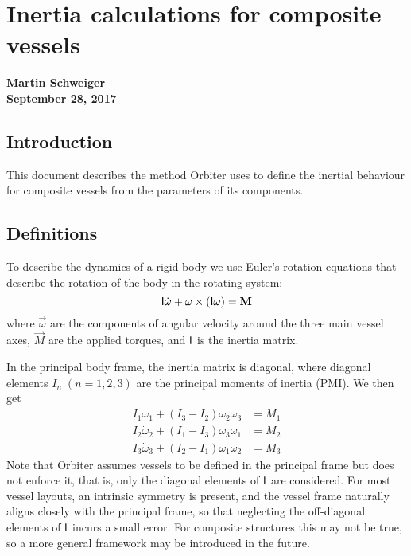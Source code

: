 \documentclass[Orbiter Technical Reference.tex]{subfiles}
\begin{document}
\section{Inertia calculations for composite vessels}
\textbf{Martin Schweiger}\\
\textbf{September 28, 2017}


\subsection{Introduction}
This document describes the method Orbiter uses to define the inertial behaviour for composite vessels from the parameters of its components.

\subsection{Definitions}
To describe the dynamics of a rigid body we use Euler's rotation equations that describe the rotation of the body in the rotating system:
\begin{equation}
\mathsf{I} \dot{\mathbf{\omega}} + \mathbf{\omega} \times (\mathsf{I}\mathbf{\omega}) = \mathbf{M}
\end{equation}
where $\vec{\omega}$ are the components of angular velocity around the three main vessel axes, $\vec{M}$ are the applied torques, and $\mathsf{I}$ is the inertia matrix.

In the principal body frame, the inertia matrix is diagonal, where diagonal elements $I_n\;(n=1,2,3)$ are the principal moments of inertia (PMI). We then get
\begin{equation}
\begin{split}
  I_1 \dot\omega_1 + (I_3 - I_2) \omega_2 \omega_3 &= M_1 \\
  I_2 \dot\omega_2 + (I_1 - I_3) \omega_3 \omega_1 &= M_2 \\
  I_3 \dot\omega_3 + (I_2 - I_1) \omega_1 \omega_2 &= M_3
\end{split}
\end{equation}
Note that Orbiter assumes vessels to be defined in the principal frame but does not enforce it, that is, only the diagonal elements of $\mathsf{I}$ are considered. For most vessel layouts, an intrinsic symmetry is present, and the vessel frame naturally aligns closely with the principal frame, so that neglecting the off-diagonal elements of $\mathsf{I}$ incurs a small error. For composite structures this may not be true, so a more general framework may be introduced in the future. 
\end{document}

